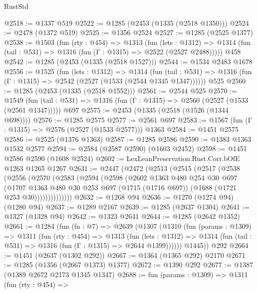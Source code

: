 \begin{lexlean}{RustStd}
\begin{coremodule}
@2518 := @1337 @519
@2522 := @1285 (@2453 (@1335 (@2518 @1350)))
@2524 := @2478 (@1372 @519)
@2525 := @1356 @2524
@2527 := @1285 (@2525 @1377)
@2538 := @1503
    (fun (rty : @454) =>
    @1313
      (fun (lets : @1312) =>
      @1314 (fun (tail : @531) => @1316 (fun (Γ : @1315) => @2522 (@2527 @2488)))))
    @458
@2542 := @1285 (@2453 (@1335 (@2518 @1527)))
@2544 := @1534 @2483 @1678
@2556 := @1525
    (fun (lets : @1312) =>
    @1314
      (fun (tail : @531) => @1316 (fun (Γ : @1315) => @2542 (@2527 (@1533 (@2544 @1345 @1347))))))
    @525
@2560 := @1285 (@2453 (@1335 (@2518 @1552)))
@2561 := @2544 @525
@2570 := @1549
    (fun (tail : @531) => @1316 (fun (Γ : @1315) => @2560 (@2527 (@1533 (@2561 @1347)))))
    @697
@2575 := @2453 (@1335 (@2518 (@1526 (@1344 @698))))
@2576 := @1285 @2575
@2577 := @2561 @697
@2583 := @1567 (fun (Γ : @1315) => @2576 (@2527 (@1533 @2577))) @1363
@2584 := @1451 @2575
@2586 := @2525 (@1376 @1363)
@2587 := @1285 @2586
@2590 := @1383 @1363 @1532 @2577
@2594 := @2584 (@2587 @2590) (@1603 @2452)
@2598 := @1451 @2586 @2590 (@1608 @2524)
@2602 := LexLeanPreservation.Rust.Corr.bOfE @1263 @1265 @1267
@2631 := @2447
    (@2472
      (@2513
        (@2515
          (@2517
            (@2538
              (@2556
                (@2570
                  (@2583
                    (@2594
                      (@2598
                        (@2602
                          @1363
                          @480
                          @254
                          @30
                          @697
                          (@1707
                            @1363
                            @480
                            @30
                            @253
                            @697
                            (@1715 (@1716 @697))
                            (@1688 (@1721 @253 @30))))))))))))))
@2632 := @1268 @94
@2636 := @1270 (@1274 @94) (@1280 @94)
@2637 := @1289 @2167
@2639 := @1285 (@2637 @1304)
@2641 := @1327 (@1328 @94)
@2642 := @1323 @2641
@2644 := @1285 (@2642 @1352)
@2661 := @1284
    (fun (fn : @7) =>
    @2639
      (@1307
        (@1310
          (fun (params : @1309) =>
          @1311
            (fun (rty : @454) =>
            @1313
              (fun (lets : @1312) =>
              @1314 (fun (tail : @531) => @1316 (fun (Γ : @1315) => @2644 @1399))))))
        @1445))
    @292
@2664 := @1451 (@2637 (@1302 @292))
@2667 := @1364 (@1365 @292) @2170
@2671 := @1285 (@1356 (@2667 @1373) @1377)
@2672 := @1390 @292
@2677 := @1387 (@1389 @2672 @2173 @1345 @1347)
@2688 := fun (params : @1309) =>
  @1311
    (fun (rty : @454) =>

\end{coremodule}
\end{lexlean}
